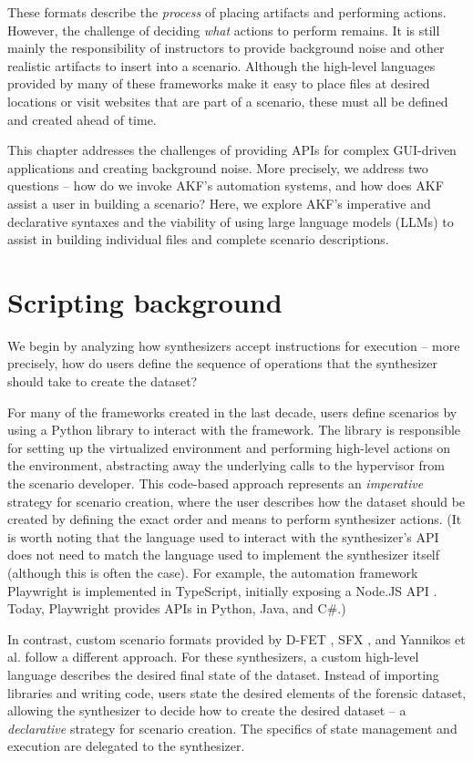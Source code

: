 \documentclass[letterpaper,12pt]{report}
\begin{document}
These formats describe the \emph{process} of placing artifacts and
performing actions. However, the challenge of deciding \emph{what}
actions to perform remains. It is still mainly the responsibility of
instructors to provide background noise and other realistic artifacts to
insert into a scenario. Although the high-level languages provided by
many of these frameworks make it easy to place files at desired
locations or visit websites that are part of a scenario, these must all
be defined and created ahead of time.

This chapter addresses the challenges of providing APIs for complex
GUI-driven applications and creating background noise. More precisely,
we address two questions -- how do we invoke AKF's automation systems,
and how does AKF assist a user in building a scenario? Here, we explore
AKF's imperative and declarative syntaxes and the viability of using
large language models (LLMs) to assist in building individual files and
complete scenario descriptions.

\section{Scripting background}\label{scripting-background}

We begin by analyzing how synthesizers accept instructions for execution
-- more precisely, how do users define the sequence of operations that
the synthesizer should take to create the dataset?

For many of the frameworks created in the last decade, users define
scenarios by using a Python library to interact with the framework. The
library is responsible for setting up the virtualized environment and
performing high-level actions on the environment, abstracting away the
underlying calls to the hypervisor from the scenario developer. This
code-based approach represents an \emph{imperative} strategy for
scenario creation, where the user describes how the dataset should be
created by defining the exact order and means to perform synthesizer
actions. (It is worth noting that the language used to interact with the
synthesizer's API does not need to match the language used to implement
the synthesizer itself (although this is often the case). For example,
the automation framework Playwright is implemented in TypeScript,
initially exposing a Node.JS API
\cite{MicrosoftPlaywrightpython2025}. Today, Playwright provides
APIs in Python, Java, and C\#.)

In contrast, custom scenario formats provided by D-FET
\cite{williamCloudbasedDigitalForensics2011}, SFX
\cite{russellForensicImageDescription2012}, and Yannikos et al.
\cite{yannikosDataCorporaDigital2014} follow a different approach.
For these synthesizers, a custom high-level language describes the
desired final state of the dataset. Instead of importing libraries and
writing code, users state the desired elements of the forensic dataset,
allowing the synthesizer to decide how to create the desired dataset --
a \emph{declarative} strategy for scenario creation. The specifics of
state management and execution are delegated to the synthesizer.
\end{document}

